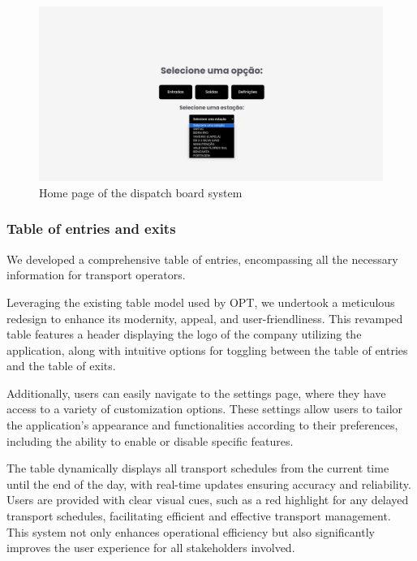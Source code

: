 \documentclass[10pt]{article}
\begin{document}
        \vfill
        \begin{figure}[htbp]
            \centering
            \includegraphics[width=1\textwidth]{home_page}
            \caption{Home page of the dispatch board system}
            \label{fig:home_page}
        \end{figure}

        \subsubsection{Table of entries and exits}

        We developed a comprehensive table of entries, encompassing all the necessary information for transport operators. 
        
        Leveraging the existing table model used by OPT, we undertook a meticulous redesign to enhance its modernity, appeal, and user-friendliness. This revamped table features a header displaying the logo of the company utilizing the application, along with intuitive options for toggling between the table of entries and the table of exits.
        
        Additionally, users can easily navigate to the settings page, where they have access to a variety of customization options. These settings allow users to tailor the application's appearance and functionalities according to their preferences, including the ability to enable or disable specific features.
        
        The table dynamically displays all transport schedules from the current time until the end of the day, with real-time updates ensuring accuracy and reliability. Users are provided with clear visual cues, such as a red highlight for any delayed transport schedules, facilitating efficient and effective transport management. This system not only enhances operational efficiency but also significantly improves the user experience for all stakeholders involved.
       
\end{document}
